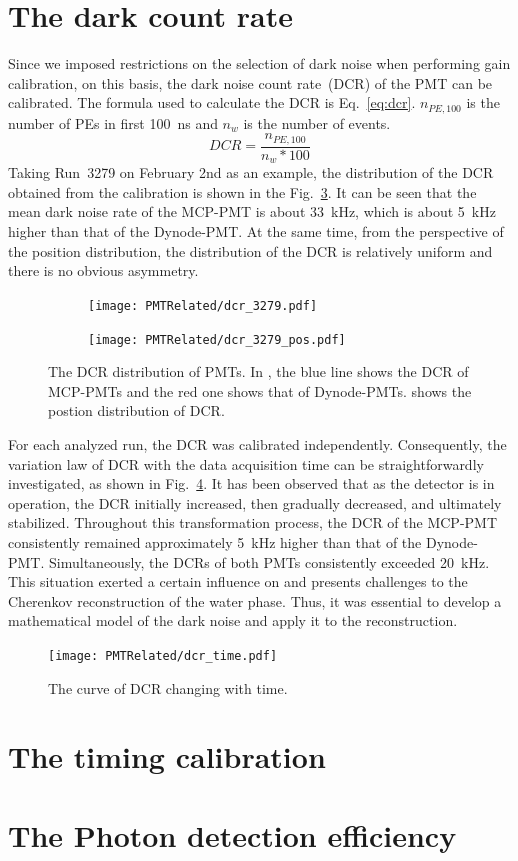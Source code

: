 \section{The dark count rate}
Since we imposed restrictions on the selection of dark noise when performing gain calibration, on this basis, the dark noise count rate~(DCR) of the PMT can be calibrated. The formula used to calculate the DCR is Eq.~\eqref{eq:dcr}. $n_{PE,100}$ is the number of PEs in first \SI{100}{ns} and $n_w$ is the number of events.
\begin{equation}
	DCR=\frac{n_{PE,100}}{n_w*100}
	\label{eq:dcr}
\end{equation}
Taking Run~3279 on February 2nd as an example, the distribution of the DCR obtained from the calibration is shown in the Fig.~\ref{fig:dcr_calib}. It can be seen that the mean dark noise rate of the MCP-PMT is about \SI{33}{kHz}, which is about \SI{5}{kHz} higher than that of the Dynode-PMT. At the same time, from the perspective of the position distribution, the distribution of the DCR is relatively uniform and there is no obvious asymmetry.
\begin{figure}[!htbp]
	\centering
	\begin{subfigure}{0.6\textwidth}
		\centering
		\texttt{[image: PMTRelated/dcr\_3279.pdf]}
		\caption{}
		\label{fig:dcr}
	\end{subfigure}%
	\hfill
	\begin{subfigure}{\textwidth}
		\centering
		\texttt{[image: PMTRelated/dcr\_3279\_pos.pdf]}
		\caption{}
		\label{fig:dcrpos}
	\end{subfigure}
	\caption{The DCR distribution of PMTs. In , the blue line shows the DCR of MCP-PMTs and the red one shows that of Dynode-PMTs.  shows the postion distribution of DCR.}
	\label{fig:dcr_calib}
\end{figure}
For each analyzed run, the DCR was calibrated independently. Consequently, the variation law of DCR with the data acquisition time can be straightforwardly investigated, as shown in Fig.~\ref{fig:dcr_time}. It has been observed that as the detector is in operation, the DCR initially increased, then gradually decreased, and ultimately stabilized. Throughout this transformation process, the DCR of the MCP-PMT consistently remained approximately \SI{5}{kHz} higher than that of the Dynode-PMT. Simultaneously, the DCRs of both PMTs consistently exceeded \SI{20}{kHz}. This situation exerted a certain influence on and presents challenges to the Cherenkov reconstruction of the water phase. Thus, it was essential to develop a mathematical model of the dark noise and apply it to the reconstruction.
\begin{figure}[!htbp]
	\centering
	\texttt{[image: PMTRelated/dcr\_time.pdf]}
	\caption{The curve of DCR changing with time.}
	\label{fig:dcr_time}
\end{figure}
\section{The timing calibration}

\section{The Photon detection efficiency}